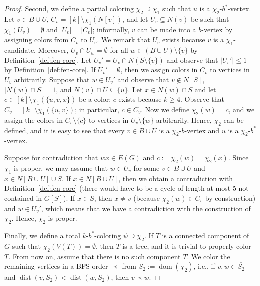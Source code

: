 \documentclass[runningheads, envcountsame]{llncs}
\newcommand{\seq}{\subseteq}
\DeclareMathOperator{\dom}{dom}
\DeclareMathOperator{\dist}{dist}
\begin{document}
\begin{proof}
\medskip
Second, we define a partial coloring $\chi_2 \supseteq \chi_1$ such that $u$ is a $\chi_2$-$b^*$-vertex.
Let $v \in B \cup U$, $C_v = [k] \setminus \chi_1(N[v])$, and let $U_v \seq N(v)$ be such that $\chi_1(U_v) = \emptyset$ and $|U_v| = |C_v|$; informally, $v$ can be made into a $b$-vertex by assigning colors from $C_v$ to $U_v$.
We remark that $U_v$ exists because $v$ is a $\chi_1$-candidate.
Moreover, $U_v \cap U_w = \emptyset$ for all $w \in (B \cup U) \setminus \{v\}$ by Definition~\ref{def:fen-core}.
Let $U_v' = U_v \cap N(S \setminus \{v\})$ and observe that $|U_v'| \le 1$ by Definition~\ref{def:fen-core}.
If $U_v' = \emptyset$, then we assign colors in $C_v$ to vertices in $U_v$ arbitrarily.
Suppose that $w \in U_v'$ and observe that $v \notin N[S]$, $|N(w) \cap S| = 1$, and $N(v) \cap U \seq \{u\}$.
Let $x \in N(w) \cap S$ and let $c \in [k] \setminus \chi_1(\{u, v, x\})$ be a color; $c$ exists because $k \ge 4$.
Observe that $C_v = [k] \setminus \chi_1(\{u, v\})$; in particular, $c \in C_v$.
Now we define $\chi_2(w) = c$, and we assign the colors in $C_v \setminus \{c\}$ to vertices in $U_v \setminus \{w\}$ arbitrarily.
Hence, $\chi_2$ can be defined, and it is easy to see that every $v \in B \cup U$ is a $\chi_2$-$b$-vertex and $u$ is a $\chi_2$-$b^*$-vertex.

Suppose for contradiction that $wx \in E(G)$ and $c := \chi_2(w) = \chi_2(x)$.
Since $\chi_1$ is proper, we may assume that $w \in U_v$ for some $v \in B\cup U$ and $x \in N[B \cup U] \cup S$.
If $x \in N[B \cup U]$, then we obtain a contradiction with Definition~\ref{def:fen-core} (there would have to be a cycle of length at most 5 not contained in $G[S]$).
If $x \in S$, then $x \ne v$ (because $\chi_2(w) \in C_v$ by construction) and $w \in U_v'$, which means that we have a contradiction with the construction of $\chi_2$.
Hence, $\chi_2$ is proper.

\medskip
Finally, we define a total $k$-$b^*$-coloring $\psi \supseteq \chi_2$.
If $T$ is a connected component of $G$ such that $\chi_2(V(T)) = \emptyset$, then $T$ is a tree, and it is trivial to properly color $T$.
From now on, assume that there is no such component $T$.
We color the remaining vertices in a BFS order $\prec$ from $S_2 := \dom(\chi_2)$, i.e., if $v, w \in \overline{S_2}$ and $\dist(v, S_2) < \dist(w, S_2)$, then $v \prec w$.


\end{proof}
\end{document}
